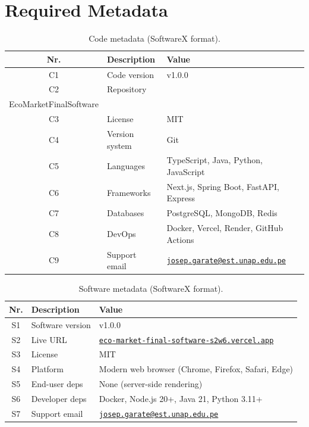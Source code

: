 \documentclass[10pt,a4paper,twocolumn]{article}
\begin{document}
\section{Required Metadata}

\begin{table}[H]
\centering
\caption{Code metadata (SoftwareX format).}
\renewcommand{\arraystretch}{1.15}
\scriptsize
\begin{tabularx}{\columnwidth}{cl X}
\toprule
\textbf{Nr.} & \textbf{Description} & \textbf{Value} \\
\midrule
C1 & Code version   & v1.0.0 \\
C2 & Repository     & \href{https://github.com/JosepVl123463/EcoMarketFinalSoftware}
                        {\texttt{github.com/JosepVl123463/\\EcoMarketFinalSoftware}} \\
C3 & License        & MIT \\
C4 & Version system & Git \\
C5 & Languages      & TypeScript, Java, Python, JavaScript \\
C6 & Frameworks     & Next.js, Spring Boot, FastAPI, Express \\
C7 & Databases      & PostgreSQL, MongoDB, Redis \\
C8 & DevOps         & Docker, Vercel, Render, GitHub Actions \\
C9 & Support email  & \href{mailto:josep.garate@est.unap.edu.pe}
                        {\texttt{josep.garate@est.unap.edu.pe}} \\
\bottomrule
\end{tabularx}
\end{table}

\begin{table}[H]
\centering
\caption{Software metadata (SoftwareX format).}
\renewcommand{\arraystretch}{1.15}
\scriptsize
\begin{tabularx}{\columnwidth}{cl X}
\toprule
\textbf{Nr.} & \textbf{Description} & \textbf{Value} \\
\midrule
S1 & Software version & v1.0.0 \\
S2 & Live URL & \href{https://eco-market-final-software-s2w6.vercel.app}
                 {\texttt{eco-market-final-software-s2w6.vercel.app}} \\
S3 & License  & MIT \\
S4 & Platform & Modern web browser (Chrome, Firefox, Safari, Edge) \\
S5 & End-user deps & None (server-side rendering) \\
S6 & Developer deps & Docker, Node.js 20+, Java 21, Python 3.11+ \\
S7 & Support email & \href{mailto:josep.garate@est.unap.edu.pe}
                      {\texttt{josep.garate@est.unap.edu.pe}} \\
\bottomrule
\end{tabularx}
\end{table}
\end{document}
